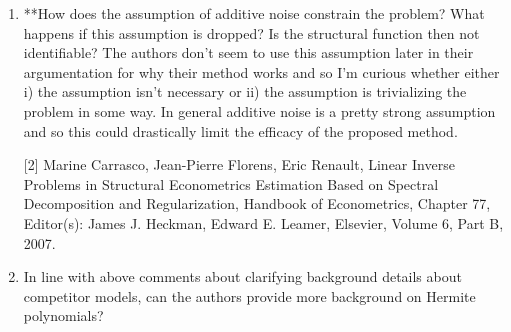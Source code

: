 \documentclass{article}
\begin{document}
\begin{enumerate}
[1] Wiatrak, M., Albrecht, S.V. and Nystrom, A., 2019. Stabilizing Generative Adversarial Networks: A Survey. arXiv preprint arXiv:1910.00927.

\item **How does the assumption of additive noise constrain the problem? What happens if this assumption is dropped? Is the structural function then not identifiable? The authors don't seem to use this assumption later in their argumentation for why their method works and so I'm curious whether either i) the assumption isn't necessary or ii) the assumption is trivializing the problem in some way. In general additive noise is a pretty strong assumption and so this could drastically limit the efficacy of the proposed method.


[2] Marine Carrasco, Jean-Pierre Florens, Eric Renault, Linear Inverse Problems in Structural Econometrics Estimation Based on Spectral Decomposition and Regularization, 
Handbook of Econometrics, Chapter 77, Editor(s): James J. Heckman, Edward E. Leamer, Elsevier, Volume 6, Part B, 2007.

  
\item In line with above comments about clarifying background details about competitor models, can the authors provide more background on Hermite polynomials?



\end{enumerate}
\end{document}
